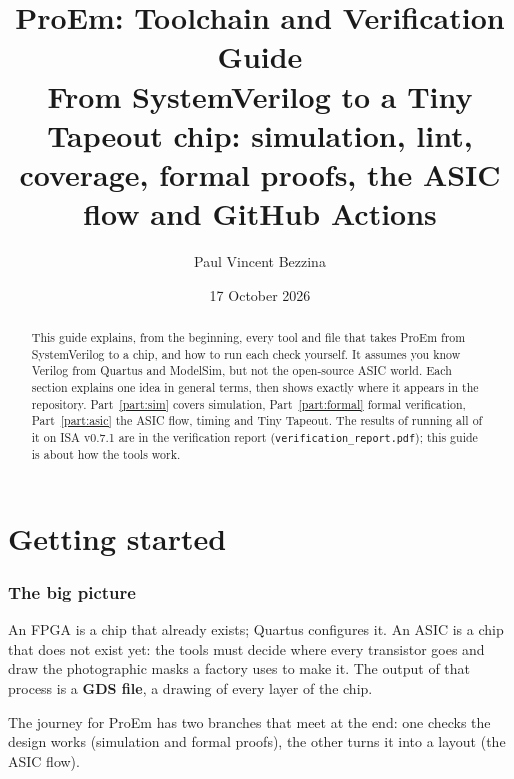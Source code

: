 \documentclass[11pt,a4paper]{article}
\title{\color{accent}\textbf{ProEm: Toolchain and Verification Guide}\\[4pt]
\large From SystemVerilog to a Tiny Tapeout chip: simulation, lint, coverage, formal proofs, the ASIC flow and GitHub Actions}
\author{Paul Vincent Bezzina}
\date{17 October 2026}
\newcommand{\file}[1]{\texttt{#1}}
\begin{document}
\maketitle

\begin{abstract}
This guide explains, from the beginning, every tool and file that takes ProEm from SystemVerilog to a chip, and how to run each check yourself. It assumes you know Verilog from Quartus and ModelSim, but not the open-source ASIC world. Each section explains one idea in general terms, then shows exactly where it appears in the repository. Part~\ref{part:sim} covers simulation, Part~\ref{part:formal} formal verification, Part~\ref{part:asic} the ASIC flow, timing and Tiny Tapeout. The results of running all of it on ISA v0.7.1 are in the verification report (\file{verification\_report.pdf}); this guide is about how the tools work.
\end{abstract}

\tableofcontents
\newpage

\part{Getting started}

\section{The big picture}

An FPGA is a chip that already exists; Quartus configures it. An ASIC is a chip that does not exist yet: the tools must decide where every transistor goes and draw the photographic masks a factory uses to make it. The output of that process is a \textbf{GDS file}, a drawing of every layer of the chip.

The journey for ProEm has two branches that meet at the end: one checks the design works (simulation and formal proofs), the other turns it into a layout (the ASIC flow).
\end{document}
